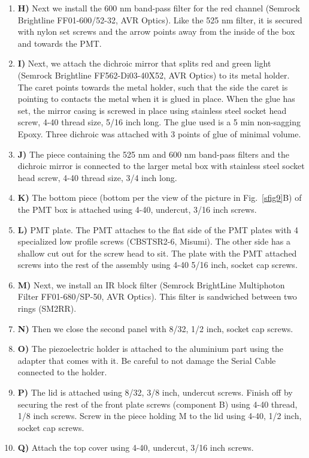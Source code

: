 \documentclass[10pt,letterpaper]{article}
\begin{document}
\begin{enumerate}[]
    \item \textbf{H)} Next we install the 600 nm band-pass filter for the red channel (Semrock Brightline FF01-600/52-32, AVR Optics). Like the 525 nm filter, it is secured with nylon set screws and the arrow points away from the inside of the box and towards the PMT.
    \item \textbf{I)} Next, we attach the dichroic mirror that splits red and green light (Semrock Brightline FF562-Di03-40X52, AVR Optics) to its metal holder. The caret points towards the metal holder, such that the side the caret is pointing to contacts the metal when it is glued in place. When the glue has set, the mirror casing is screwed in place using stainless steel socket head screw, 4-40 thread size, 5/16 inch long. The glue used is a 5 min non-sagging Epoxy. Three dichroic was attached with 3 points of glue of minimal volume.
    \item \textbf{J)} The piece containing the 525 nm and 600 nm band-pass filters and the dichroic mirror is connected to the larger metal box with stainless steel socket head screw, 4-40 thread size, 3/4 inch long.
    \item \textbf{K)} The bottom piece (bottom per the view of the picture in Fig.~\ref{sfig9}B) of the PMT box is attached using 4-40, undercut, 3/16 inch screws.
    \item \textbf{L)} PMT plate. The PMT attaches to the flat side of the PMT plates with 4 specialized low profile screws (CBSTSR2-6, Misumi). The other side has a shallow cut out for the screw head to sit. The plate with the PMT attached screws into the rest of the assembly using 4-40 5/16 inch, socket cap screws.
    \item \textbf{M)} Next, we install an IR block filter (Semrock BrightLine Multiphoton Filter FF01-680/SP-50, AVR Optics). This filter is sandwiched between two rings (SM2RR).
    \item \textbf{N)} Then we close the second panel with 8/32, 1/2 inch, socket cap screws.
    \item \textbf{O)} The piezoelectric holder is attached to the aluminium part using the adapter that comes with it. Be careful to not damage the Serial Cable connected to the holder.
    \item \textbf{P)} The lid is attached using 8/32, 3/8 inch, undercut screws. Finish off by securing the rest of the front plate screws (component B) using 4-40 thread, 1/8 inch screws. Screw in the piece holding M to the lid using 4-40, 1/2 inch, socket cap screws.
    \item \textbf{Q)} Attach the top cover using 4-40, undercut, 3/16 inch screws.
\end{enumerate}
%
\end{document}
